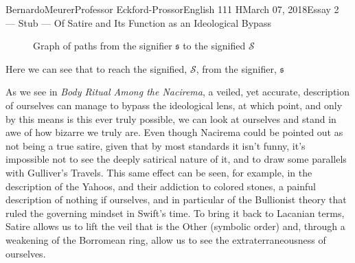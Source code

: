 \documentclass[12pt,letterpaper]{article}
\begin{document}
\begin{mla}{Bernardo}{Meurer}{Professor Eckford-Prossor}{English 111 H}{March 07, 2018}{Essay 2 --- Stub --- Of Satire and Its Function as an Ideological Bypass}
\begin{figure}[H]
        \caption{Graph of paths from the signifier \(\mathfrak{s}\) to the signified \(\mathscr{S}\)}\label{fig:graph}
    \end{figure}
    \noindent Here we can see that to reach the signified, \(\mathscr{S}\),
    from the signifier, \(\mathfrak{s}\)

    As we see in \textit{Body Ritual Among the Nacirema}, a veiled, yet accurate, description of ourselves can manage to bypass the ideological lens, at which point, and only by this means is this ever truly possible, we can look at ourselves and stand in awe of how bizarre we truly are. Even though Nacirema could be pointed out as not being a true satire, given that by most standards it isn't funny, it's impossible not to see the deeply satirical nature of it, and to draw some parallels with Gulliver's Travels. This same effect can be seen, for example, in the description of the Yahoos, and their addiction to colored stones, a painful description of nothing if ourselves, and in particular of the Bullionist theory that ruled the governing mindset in Swift's time. To bring it back to Lacanian terms, Satire allows us to lift the veil that is the Other (symbolic order) and, through a weakening of the Borromean ring, allow us to see the extraterraneousness of ourselves.


\end{mla}
\end{document}
